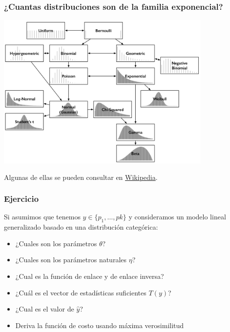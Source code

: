 \documentclass{beamer}
\begin{document}
\begin{frame}
  \frametitle{¿Cuantas distribuciones son de la familia exponencial?}

  \begin{center}
    \includegraphics[width=0.8\textwidth]{./img/common_distributions.png}
  
    Algunas de ellas se pueden consultar en \href{https://en.wikipedia.org/wiki/Exponential_family\#Table_of_distributions}{Wikipedia}.
      
  \end{center}
\end{frame}

\begin{frame}
  \frametitle{Ejercicio}

  Si asumimos que tenemos $y \in \{p_1, \ldots, pk\}$ y consideramos un modelo lineal generalizado basado en una distribución categórica:
  \begin{itemize}
    \item ¿Cuales son los parámetros $\theta$?
    \item ¿Cuales son los parámetros naturales $\eta$?
    \item ¿Cual es la función de enlace y de enlace inversa?
    \item ¿Cuál es el vector de estadísticas suficientes $T(y)$?
    \item ¿Cual es el valor de $\hat{y}$?
    \item Deriva la función de costo usando máxima verosimilitud
  \end{itemize}

\end{frame}
\end{document}
